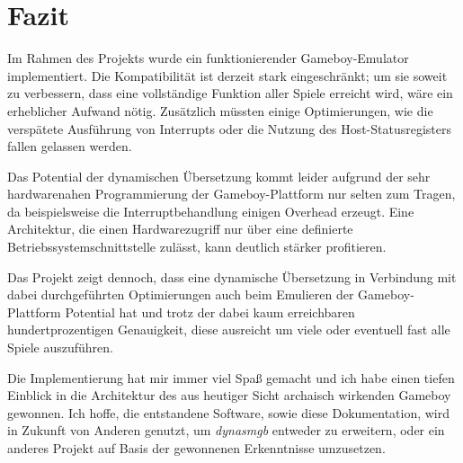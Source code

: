 \documentclass[a4paper]{scrartcl}
\begin{document}
\pagebreak

\section{Fazit}
Im Rahmen des Projekts wurde ein funktionierender Gameboy-Emulator implementiert. Die Kompatibilität ist derzeit stark eingeschränkt; um sie soweit zu verbessern, dass eine vollständige Funktion aller Spiele erreicht wird, wäre ein erheblicher Aufwand nötig. Zusätzlich müssten einige Optimierungen, wie die verspätete Ausführung von Interrupts oder die Nutzung des Host-Statusregisters fallen gelassen werden.

Das Potential der dynamischen Übersetzung kommt leider aufgrund der sehr hardwarenahen Programmierung der Gameboy-Plattform nur selten zum Tragen, da beispielsweise die Interruptbehandlung einigen Overhead erzeugt. Eine Architektur, die einen Hardwarezugriff nur über eine definierte Betriebssystemschnittstelle zulässt, kann deutlich stärker profitieren.

Das Projekt zeigt dennoch, dass eine dynamische Übersetzung in Verbindung mit dabei durchgeführten Optimierungen auch beim Emulieren der Gameboy-Plattform Potential hat und trotz der dabei kaum erreichbaren hundertprozentigen Genauigkeit, diese ausreicht um viele oder eventuell fast alle Spiele auszuführen.

Die Implementierung hat mir immer viel Spaß gemacht und ich habe einen tiefen Einblick in die Architektur des aus heutiger Sicht archaisch wirkenden Gameboy gewonnen. Ich hoffe, die entstandene Software, sowie diese Dokumentation, wird in Zukunft von Anderen genutzt, um \emph{dynasmgb} entweder zu erweitern, oder ein anderes Projekt auf Basis der gewonnenen Erkenntnisse umzusetzen.

\pagebreak
\nocite{*}
\printbibliography

\clearpage
\pagebreak


\end{document}
